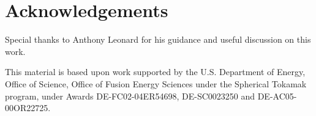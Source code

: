 \section*{Acknowledgements}

Special thanks to Anthony Leonard for his guidance and useful discussion on this work.

This material is based upon work supported by the U.S. Department of Energy, Office of Science, Office of Fusion Energy Sciences under the Spherical Tokamak program,
under Awards 
DE-FC02-04ER54698,  %
DE-SC0023250 %
and
DE-AC05-00OR22725. %

